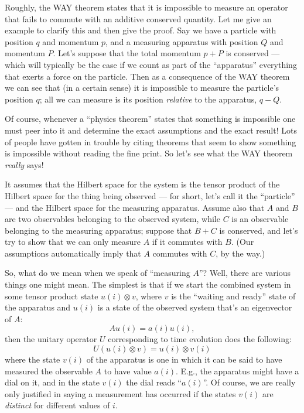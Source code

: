 \documentclass{article}
\begin{document}
Roughly, the WAY theorem states that it is impossible to measure an
operator that fails to commute with an additive conserved quantity. Let
me give an example to clarify this and then give the proof. Say we have
a particle with position \(q\) and momentum \(p\), and a measuring
apparatus with position \(Q\) and momentum \(P\). Let's suppose that the
total momentum \(p + P\) is conserved --- which will typically be the
case if we count as part of the ``apparatus'' everything that exerts a
force on the particle. Then as a consequence of the WAY theorem we can
see that (in a certain sense) it is impossible to measure the particle's
position \(q\); all we can measure is its position \emph{relative} to
the apparatus, \(q-Q\).

Of course, whenever a ``physics theorem'' states that something is
impossible one must peer into it and determine the exact assumptions and
the exact result! Lots of people have gotten in trouble by citing
theorems that seem to show something is impossible without reading the
fine print. So let's see what the WAY theorem \emph{really} says!

It assumes that the Hilbert space for the system is the tensor product
of the Hilbert space for the thing being observed --- for short, let's
call it the ``particle'' --- and the Hilbert space for the measuring
apparatus. Assume also that \(A\) and \(B\) are two observables
belonging to the observed system, while \(C\) is an observable belonging
to the measuring apparatus; suppose that \(B + C\) is conserved, and
let's try to show that we can only measure \(A\) if it commutes with
\(B\). (Our assumptions automatically imply that \(A\) commutes with
\(C\), by the way.)

So, what do we mean when we speak of ``measuring \(A\)''? Well, there
are various things one might mean. The simplest is that if we start the
combined system in some tensor product state \(u(i) \otimes v\), where
\(v\) is the ``waiting and ready'' state of the apparatus and \(u(i)\)
is a state of the observed system that's an eigenvector of \(A\):
\[Au(i) = a(i)u(i),\] then the unitary operator \(U\) corresponding to
time evolution does the following:
\[U(u(i) \otimes v) = u(i) \otimes v(i)\] where the state \(v(i)\) of
the apparatus is one in which it can be said to have measured the
observable \(A\) to have value \(a(i)\). E.g., the apparatus might have
a dial on it, and in the state \(v(i)\) the dial reads ``\(a(i)\)''. Of
course, we are really only justified in saying a measurement has
occurred if the states \(v(i)\) are \emph{distinct} for different values
of \(i\).
\end{document}
